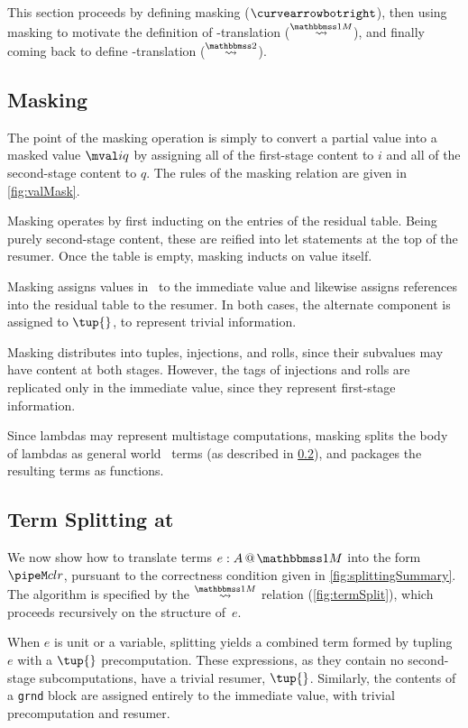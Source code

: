 \begin{abstrsyn}
This section proceeds by defining masking ($\vsplito$), 
then using masking to motivate the definition of \bbonem-translation ($\splitonesym$),
and finally coming back to define \bbtwo-translation ($\splittwosym$).

\subsection{Masking}

The point of the masking operation is simply to convert a partial value into a masked value $\mval i q$
by assigning all of the first-stage content to $i$ and all of the second-stage content to $q$.
The rules of the masking relation are given in \ref{fig:valMask}.

Masking operates by first inducting on the entries of the residual table.  
Being purely second-stage content, these are reified into let statements at the top of the resumer.
Once the table is empty, masking inducts on value itself.

Masking assigns values in \bbonep\ to the immediate value
and likewise assigns references into the residual table to the resumer.
In both cases, the alternate component is assigned to $\tup{}$, to represent trivial information.

Masking distributes into tuples, injections, and rolls, since their subvalues may have content at both stages.
However, the tags of injections and rolls are replicated only in the immediate value, 
since they represent first-stage information.

Since lambdas may represent multistage computations, 
masking splits the body of lambdas as general world \bbonem\ terms (as described in \ref{sec:split-one}), 
and packages the resulting terms as functions.

\subsection{Term Splitting at \bbonem}
\label{sec:split-one}

We now show how to translate terms $\colmix e A$ into the form $\pipeM c l r$,
pursuant to the correctness condition given in \ref{fig:splittingSummary}.
The algorithm is specified by the $\splitonesym$ relation (\cref{fig:termSplit}), 
which proceeds recursively on the structure of~$e$.

When $e$ is unit or a variable,
splitting yields a combined term formed by tupling $e$ with a $\tup{}$ precomputation.
These expressions, as they contain no second-stage subcomputations, have a trivial resumer, $\tup{}$.
Similarly, the contents of a \texttt{grnd} block are assigned entirely to the immediate value,
with trivial precomputation and resumer.


\end{abstrsyn}
